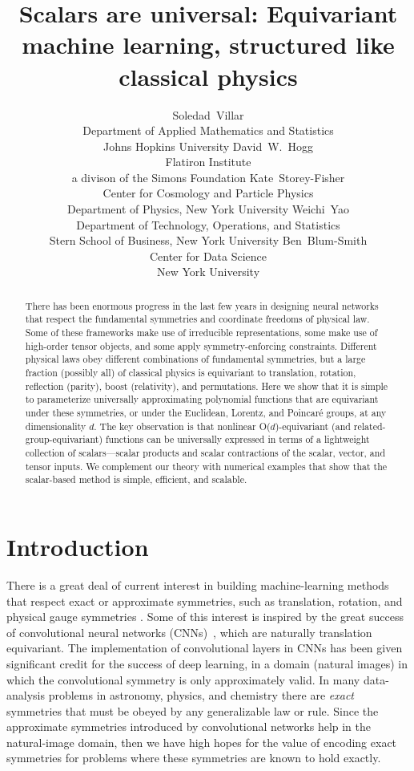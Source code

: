 \documentclass{article}
\date{}
\title{\bfseries%
Scalars are universal: Equivariant machine learning, structured like classical physics}
\author{%
Soledad~Villar\\
Department of Applied Mathematics and Statistics\\
Johns Hopkins University
\And
David~W.~Hogg\\
Flatiron Institute\\
a divison of the Simons Foundation
\And
Kate~Storey-Fisher\\
Center for Cosmology and Particle Physics\\
Department of Physics,
New York University
\And
Weichi~Yao\\
Department of Technology, Operations, and Statistics\\
Stern School of Business,
New York University
\And
Ben~Blum-Smith\\
Center for Data Science\\
New York University
}
\theoremstyle{Hogg}
\begin{document}
\maketitle

\begin{abstract}\noindent
    There has been enormous progress in the last few years in designing  neural networks that respect the fundamental symmetries and coordinate freedoms of physical law.
    Some of these frameworks make use of irreducible representations, some make use of high-order tensor objects, and some apply symmetry-enforcing constraints.
    Different physical laws obey different combinations of fundamental symmetries, but a large fraction (possibly all) of classical physics is equivariant to translation, rotation, reflection (parity), boost (relativity), and permutations.
    Here we show that it is simple to parameterize universally approximating polynomial functions that are equivariant under these symmetries, or under the Euclidean, Lorentz, and Poincar\'e groups, at any dimensionality $d$.
    The key observation is that nonlinear O($d$)-equivariant (and related-group-equivariant) functions can be universally expressed in terms of a lightweight collection of scalars---scalar products and scalar contractions of the scalar, vector, and tensor inputs.
    We complement our theory with numerical examples that show that the scalar-based method is simple, efficient, and scalable. 
\end{abstract}

\section{Introduction}
There is a great deal of current interest in building machine-learning methods that respect exact or approximate symmetries, such as translation, rotation, and physical gauge symmetries \cite{cohen2019gauge, kondor2018n}.
Some of this interest is inspired by the great success of convolutional neural networks (CNNs)~\cite{lecun2015deep}, which are naturally translation equivariant.
The implementation of convolutional layers in CNNs has been given significant credit for the success of deep learning, in a domain (natural images) in which the convolutional symmetry is only approximately valid.
In many data-analysis problems in astronomy, physics, and chemistry there are \emph{exact} symmetries that must be obeyed by any generalizable law or rule.
Since the approximate symmetries introduced by convolutional networks help in the natural-image domain, then we have high hopes for the value of encoding exact symmetries for problems where these symmetries are known to hold exactly. %
\end{document}
